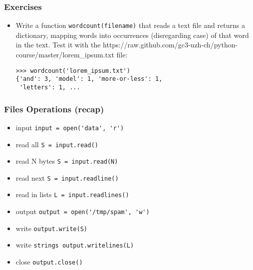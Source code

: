 \begin{frame}[fragile]\frametitle{Exercises}
\begin{itemize}
\item
    Write a function \lstinline|wordcount(filename)| that reads a text file and returns a dictionary, mapping words into occurrences (disregarding case) of that word in the text.  
    Test it with the https://raw.github.com/gc3-uzh-ch/python-course/master/lorem\_ipsum.txt file:
    \begin{lstlisting}
>>> wordcount('lorem_ipsum.txt')
{'and': 3, 'model': 1, 'more-or-less': 1,
 'letters': 1, ...
    \end{lstlisting}
 \end{itemize}
\end{frame}



\begin{frame}[fragile]\frametitle{Files Operations (recap)}
  \begin{itemize}
  \item input \lstinline{input = open('data', 'r')}
  \item read all \lstinline{S = input.read()}
  \item read N bytes \lstinline{S = input.read(N)}
  \item read next \lstinline{S = input.readline()}
  \item read in lists \lstinline{L = input.readlines()}
  \item output \lstinline{output = open('/tmp/spam', 'w')}
  \item write \lstinline{output.write(S)}
  \item write \lstinline{strings output.writelines(L)}
  \item close \lstinline{output.close()}
  \end{itemize}
\end{frame}


